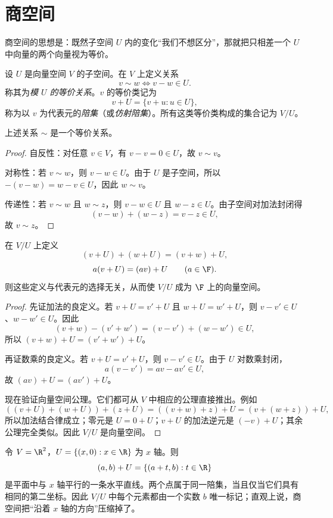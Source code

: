 \section{商空间}

商空间的思想是：既然子空间 $U$ 内的变化“我们不想区分”，那就把只相差一个 $U$ 中向量的两个向量视为等价。

\begin{definition}
设 $U$ 是向量空间 $V$ 的子空间。在 $V$ 上定义关系
\[
v\sim w \iff v-w\in U.
\]
称其为\emph{模 $U$ 的等价关系}。$v$ 的等价类记为
\[
v+U=\{v+u:u\in U\},
\]
称为以 $v$ 为代表元的\emph{陪集}（或\emph{仿射陪集}）。所有这类等价类构成的集合记为 $V/U$。
\end{definition}

\begin{proposition}
上述关系 $\sim$ 是一个等价关系。
\end{proposition}

\begin{proof}
自反性：对任意 $v\in V$，有 $v-v=0\in U$，故 $v\sim v$。

对称性：若 $v\sim w$，则 $v-w\in U$。由于 $U$ 是子空间，所以 $-(v-w)=w-v\in U$，因此 $w\sim v$。

传递性：若 $v\sim w$ 且 $w\sim z$，则 $v-w\in U$ 且 $w-z\in U$。由子空间对加法封闭得
\[
(v-w)+(w-z)=v-z\in U,
\]
故 $v\sim z$。
\end{proof}

\begin{proposition}[商空间运算的良定义]
在 $V/U$ 上定义
\[
(v+U)+(w+U)=(v+w)+U,
\]
\[
a(v+U)=(av)+U\qquad (a\in\F).
\]
则这些定义与代表元的选择无关，从而使 $V/U$ 成为 $\F$ 上的向量空间。
\end{proposition}

\begin{proof}
先证加法的良定义。若 $v+U=v'+U$ 且 $w+U=w'+U$，则 $v-v'\in U$、$w-w'\in U$。因此
\[
(v+w)-(v'+w')=(v-v')+(w-w')\in U,
\]
所以 $(v+w)+U=(v'+w')+U$。

再证数乘的良定义。若 $v+U=v'+U$，则 $v-v'\in U$。由于 $U$ 对数乘封闭，
\[
a(v-v')=av-av'\in U,
\]
故 $(av)+U=(av')+U$。

现在验证向量空间公理。它们都可从 $V$ 中相应的公理直接推出。例如
\[
((v+U)+(w+U))+(z+U)=((v+w)+z)+U=(v+(w+z))+U,
\]
所以加法结合律成立；零元是 $U=0+U$；$v+U$ 的加法逆元是 $(-v)+U$；其余公理完全类似。因此 $V/U$ 是向量空间。
\end{proof}

\begin{example}[平面模掉一条直线]
令 $V=\R^2$，$U=\{(x,0):x\in\R\}$ 为 $x$ 轴。则
\[
(a,b)+U=\{(a+t,b):t\in\R\}
\]
是平面中与 $x$ 轴平行的一条水平直线。两个点属于同一陪集，当且仅当它们具有相同的第二坐标。因此 $V/U$ 中每个元素都由一个实数 $b$ 唯一标记；直观上说，商空间把“沿着 $x$ 轴的方向”压缩掉了。
\end{example}

